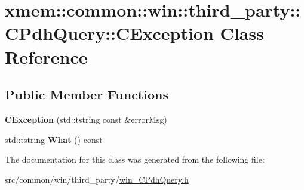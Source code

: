 \hypertarget{classxmem_1_1common_1_1win_1_1third__party_1_1_c_pdh_query_1_1_c_exception}{}\section{xmem\+:\+:common\+:\+:win\+:\+:third\+\_\+party\+:\+:C\+Pdh\+Query\+:\+:C\+Exception Class Reference}
\label{classxmem_1_1common_1_1win_1_1third__party_1_1_c_pdh_query_1_1_c_exception}
\subsection*{Public Member Functions}
\begin{DoxyCompactItemize}
\item 
\hypertarget{classxmem_1_1common_1_1win_1_1third__party_1_1_c_pdh_query_1_1_c_exception_a9dfc0cf08b098d834f73c0b9bc09e747}{}{\bfseries C\+Exception} (std\+::tstring const \&error\+Msg)\label{classxmem_1_1common_1_1win_1_1third__party_1_1_c_pdh_query_1_1_c_exception_a9dfc0cf08b098d834f73c0b9bc09e747}

\item 
\hypertarget{classxmem_1_1common_1_1win_1_1third__party_1_1_c_pdh_query_1_1_c_exception_ac8c712fa04667506d4f362bba183a812}{}std\+::tstring {\bfseries What} () const \label{classxmem_1_1common_1_1win_1_1third__party_1_1_c_pdh_query_1_1_c_exception_ac8c712fa04667506d4f362bba183a812}

\end{DoxyCompactItemize}


The documentation for this class was generated from the following file\+:\begin{DoxyCompactItemize}
\item 
src/common/win/third\+\_\+party/\hyperlink{win___c_pdh_query_8h}{win\+\_\+\+C\+Pdh\+Query.\+h}\end{DoxyCompactItemize}
